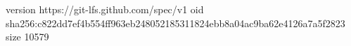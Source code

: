 version https://git-lfs.github.com/spec/v1
oid sha256:c822dd7ef4b554ff963eb248052185311824ebb8a04ac9ba62e4126a7a5f2823
size 10579
